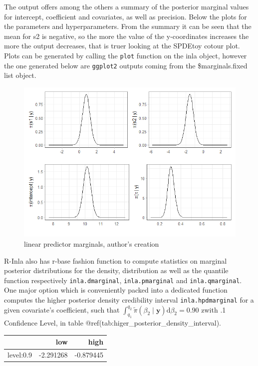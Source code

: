 \documentclass[
  12pt,
  a4paper,
  oneside]{book}
\newcommand{\passthrough}[1]{#1}
\theoremstyle{definition}
\theoremstyle{definition}
\theoremstyle{definition}
\theoremstyle{remark}
\begin{document}
The output offers among the others a summary of the posterior marginal values for intercept, coefficient and covariates, as well as precision. Below the plots for the parameters and hyperparameters. From the summary it can be seen that the mean for s2 is negative, so the more the value of the y-coordinates increases the more the output decreases, that is truer looking at the SPDEtoy cotour plot. Plots can be generated by calling the \passthrough{\lstinline!plot!} function on the inla object, however the one generated below are \passthrough{\lstinline!ggplot2!} outputs coming from the \$marginals.fixed list object.

\begin{figure}
\centering
\includegraphics{images/marginal_distr.png}
\caption{linear predictor marginals, author's creation}
\end{figure}

R-Inla also has r-base fashion function to compute statistics on marginal posterior distributions for the density, distribution as well as the quantile function respectively \passthrough{\lstinline!inla.dmarginal!}, \passthrough{\lstinline!inla.pmarginal!} and \passthrough{\lstinline!inla.qmarginal!}. One major option which is conveniently packed into a dedicated function computes the higher posterior density credibility interval \passthrough{\lstinline!inla.hpdmarginal!} for a given covariate's coefficient, such that \(\int_{q_{1}}^{q_{2}} \tilde{\pi}\left(\beta_{2} \mid \boldsymbol{y}\right) \mathrm{d} \beta_{2}=0.90\) zwith .1 Confidence Level, in table @ref(tab:higer\_posterior\_density\_interval).

\begin{tabular}{lrr}
\toprule
  & low & high\\
\midrule
level:0.9 & -2.291268 & -0.879445\\
\bottomrule
\end{tabular}
\end{document}
